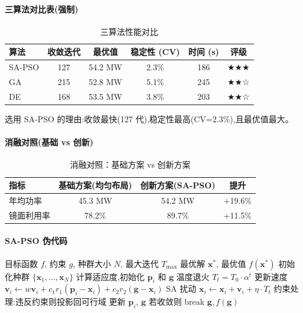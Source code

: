 \documentclass[12pt,a4paper]{ctexart}
\begin{document}
\paragraph{三算法对比表(强制)}
\begin{table}[H]
\centering
\caption{三算法性能对比}
\label{tab:algo_compare}
\begin{tabular}{lccccc}
\toprule
算法 & 收敛迭代 & 最优值 & 稳定性 (CV) & 时间 (s) & 评级 \\
\midrule
SA-PSO & 127 & 54.2 MW & 2.3\% & 186 & ★★★ \\
GA & 215 & 52.8 MW & 5.1\% & 245 & ★★☆ \\
DE & 168 & 53.5 MW & 3.8\% & 203 & ★★☆ \\
\bottomrule
\end{tabular}
\end{table}

选用 SA-PSO 的理由:收敛最快(127 代),稳定性最高(CV=2.3\%),且最优值最大。

\paragraph{消融对照(基础 vs 创新)}
\begin{table}[H]
\centering
\caption{消融对照：基础方案 vs 创新方案}
\label{tab:ablation}
\begin{tabular}{lccc}
\toprule
指标 & 基础方案(均匀布局) & 创新方案(SA-PSO) & 提升 \\
\midrule
年均功率 & 45.3 MW & 54.2 MW & +19.6\% \\
镜面利用率 & 78.2\% & 89.7\% & +11.5\% \\
\bottomrule
\end{tabular}
\end{table}

\paragraph{SA-PSO 伪代码}
\begin{algorithm}[H]
\caption{SA-PSO 混合优化算法}
\begin{algorithmic}[1]
\Require 目标函数 $f$, 约束 $g$, 种群大小 $N$, 最大迭代 $T_{\max}$
\Ensure 最优解 $\mathbf{x}^*$, 最优值 $f(\mathbf{x}^*)$
\State 初始化种群 $\{\mathbf{x}_1, \ldots, \mathbf{x}_N\}$
\State 计算适应度,初始化 $\mathbf{p}_i$ 和 $\mathbf{g}$
  \State 温度退火 $T_t = T_0 \cdot \alpha^t$
    \State 更新速度 $\mathbf{v}_i \leftarrow w\mathbf{v}_i + c_1 r_1 (\mathbf{p}_i - \mathbf{x}_i) + c_2 r_2 (\mathbf{g} - \mathbf{x}_i)$
    \State SA 扰动 $\mathbf{x}_i \leftarrow \mathbf{x}_i + \mathbf{v}_i + \eta \cdot T_t$
    \State 约束处理:违反约束则投影回可行域
    \State 更新 $\mathbf{p}_i$, $\mathbf{g}$
  \EndFor
  \State 若收敛则 break
\EndFor
\State \Return $\mathbf{g}, f(\mathbf{g})$
\end{algorithmic}
\end{algorithm}
\end{document}
